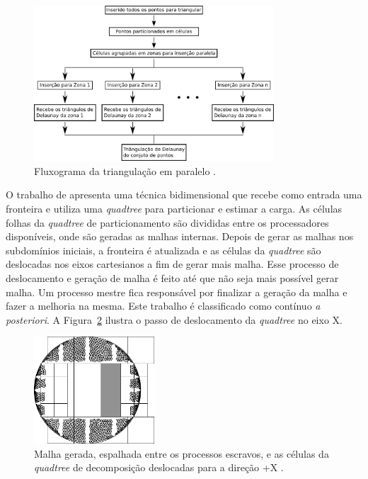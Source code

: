    \begin{figure}[htbp]
     \centering
     \includegraphics[width=0.8\textwidth]{fig/lo12_2.png}
     \caption{ Fluxograma da triangulação em paralelo \cite{bib:Lo12}.}
     \label{fig:lo12_2}
 \end{figure}

 O trabalho de \cite{bib:MFreitas13} apresenta uma técnica bidimensional que recebe como entrada uma fronteira e utiliza uma \textit{quadtree} para particionar e estimar a carga. As células folhas da \textit{quadtree} de particionamento são divididas entre os processadores disponíveis, onde são geradas as malhas internas. Depois de gerar as malhas nos subdomínios iniciais, a fronteira é atualizada e as células da \textit{quadtree} são deslocadas nos eixos cartesianos a fim de gerar mais malha. Esse processo de deslocamento e geração de malha é feito até que não seja mais possível gerar malha. Um processo mestre fica responsável por finalizar a geração da malha e fazer a melhoria na mesma. Este trabalho é classificado como contínuo \textit{a posteriori}. A Figura~\ref{fig:mfreitas} ilustra o passo de deslocamento da \textit{quadtree} no eixo X.
 
  \begin{figure}[htbp]
     \centering
     \includegraphics[width=0.4\textwidth]{fig/decomposition_quadtree_shift.png}
     \caption{ Malha gerada, espalhada entre os processos escravos, e as células da \textit{quadtree} de decomposição deslocadas para a direção +X \cite{bib:MFreitas13}.}
     \label{fig:mfreitas}
 \end{figure}
 
